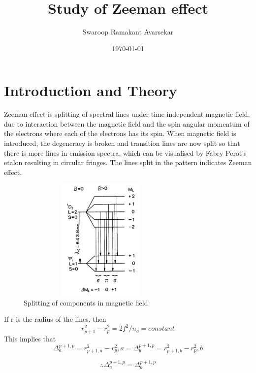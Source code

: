 \documentclass[a4paper, amsfonts, amssymb, amsmath, reprint, showkeys, nofootinbib, twoside]{revtex4-1}
\begin{document}
\title{Study of Zeeman effect}
\author{Swaroop Ramakant Avarsekar}
\date{\today}
	
\maketitle

\section{Introduction and Theory}
Zeeman effect is splitting of spectral lines under time independent magnetic field, due to interaction between the magnetic field and the spin angular momentum of the electrons where each of the electrons has its spin. When magnetic field is introduced, the degeneracy is broken and transition lines are now split so that there is more lines in emission spectra, which can be visualised by Fabry Perot's etalon resulting in circular fringes. The lines split in the pattern indicates Zeeman effect.

\begin{figure}[H] %
	\centering
	\includegraphics[width=8.3cm,height=6cm]{t} 
	\caption{Splitting of components in magnetic field}
\end{figure}

If r is the radius of the lines, then
\begin{equation}
	r^2_{p+1}-r^2_p=2f^2/n_o=constant
\end{equation}
This implies that
\begin{equation}
	\Delta^{p+1,p}_a=r^2_{p+1,a}-r^2_p,a =\Delta^{p+1,p}_b=r^2_{p+1,b}-r^2_p,b
\end{equation}

\begin{equation}
	\therefore \Delta^{p+1,p}_a=\Delta^{p+1,p}_b
\end{equation}
\end{document}
